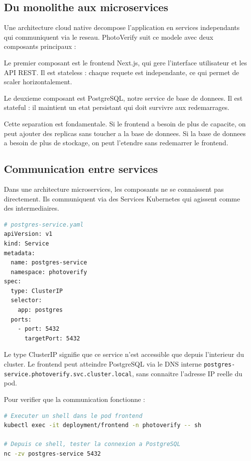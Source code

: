 \documentclass[12pt,a4paper]{article}
\begin{document}
\subsection{Du monolithe aux microservices}

Une architecture cloud native decompose l'application en services independants qui communiquent via le reseau. PhotoVerify suit ce modele avec deux composants principaux :

Le premier composant est le frontend Next.js, qui gere l'interface utilisateur et les API REST. Il est stateless : chaque requete est independante, ce qui permet de scaler horizontalement.

Le deuxieme composant est PostgreSQL, notre service de base de donnees. Il est stateful : il maintient un etat persistant qui doit survivre aux redemarrages.

Cette separation est fondamentale. Si le frontend a besoin de plus de capacite, on peut ajouter des replicas sans toucher a la base de donnees. Si la base de donnees a besoin de plus de stockage, on peut l'etendre sans redemarrer le frontend.

\subsection{Communication entre services}

Dans une architecture microservices, les composants ne se connaissent pas directement. Ils communiquent via des Services Kubernetes qui agissent comme des intermediaires.

\begin{lstlisting}[language=bash, caption={Configuration du service PostgreSQL}]
# postgres-service.yaml
apiVersion: v1
kind: Service
metadata:
  name: postgres-service
  namespace: photoverify
spec:
  type: ClusterIP
  selector:
    app: postgres
  ports:
    - port: 5432
      targetPort: 5432
\end{lstlisting}

Le type ClusterIP signifie que ce service n'est accessible que depuis l'interieur du cluster. Le frontend peut atteindre PostgreSQL via le DNS interne \texttt{postgres-service.photoverify.svc.cluster.local}, sans connaitre l'adresse IP reelle du pod.

Pour verifier que la communication fonctionne :

\begin{lstlisting}[language=bash, caption={Test de connectivite entre services}]
# Executer un shell dans le pod frontend
kubectl exec -it deployment/frontend -n photoverify -- sh

# Depuis ce shell, tester la connexion a PostgreSQL
nc -zv postgres-service 5432
\end{lstlisting}
\end{document}
